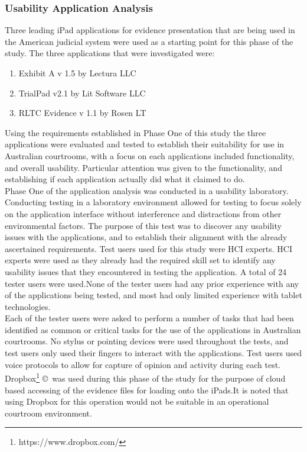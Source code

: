 \documentclass{article}
\begin{document}
\subsubsection{Usability Application Analysis}
Three leading iPad applications for evidence presentation that are being used in the American judicial system were used as a starting point for this phase of the study. The three applications that were investigated were:
\begin{enumerate}
    \item Exhibit A v 1.5 by Lectura LLC
    \item TrialPad v2.1 by Lit Software LLC
    \item RLTC Evidence v 1.1 by Rosen LT
\end{enumerate} 
Using the requirements established in Phase One of this study the three applications were evaluated and tested to establish their suitability for use in Australian courtrooms, with a focus on each applications included functionality, and overall usability. Particular attention was given to the functionality, and establishing if each application actually did what it claimed to do.\\
Phase One of the application analysis was conducted in a usability laboratory. Conducting testing in a laboratory environment allowed for testing to focus solely on the application interface without interference and distractions from other environmental factors.
The purpose of this test was to discover any usability issues with the applications, and to establish their alignment with the already ascertained requirements. Test users used for this study were HCI experts. HCI experts were used as they already had the required skill set to identify any usability issues that they encountered in testing the application. A total of 24 tester users were used.None of the tester users had any prior experience with any of the applications being tested, and most had only limited experience with tablet technologies.\\
Each of the tester users were asked to perform a number of tasks that had been identified as common or critical tasks for the use of the applications in Australian courtrooms. No stylus or pointing devices were used throughout the tests, and test users only used their fingers to interact with the applications. Test users used voice protocols to allow for capture of opinion and activity during each test. Dropbox\footnote{https://www.dropbox.com/} \copyright\   was used during this phase of the study for the purpose of cloud based accessing  of the  evidence files for loading onto the iPads.It is noted that using Dropbox for this operation would not be suitable in an operational courtroom environment.
\end{document}
